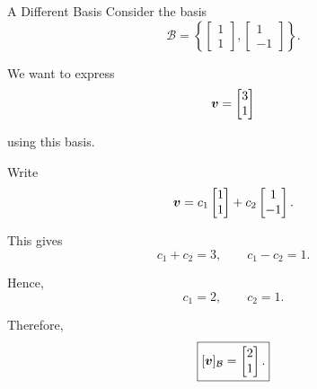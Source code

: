 \begin{frame}{A Different Basis}
\vspace{-0.3cm}
Consider the basis
\vspace{-0.1cm}
\[
\mathcal{B}
=
\left\{
\begin{bmatrix}
1\\1
\end{bmatrix},
\begin{bmatrix}
1\\-1
\end{bmatrix}
\right\}.
\]

We want to express
\vspace{-0.4cm}
\[
\bm{v}
=
\begin{bmatrix}
3\\1
\end{bmatrix}
\]
\vspace{-0.5cm}

using this basis.

Write
\vspace{-0.1cm}
\[
\bm{v}
=
c_1
\begin{bmatrix}
1\\1
\end{bmatrix}
+
c_2
\begin{bmatrix}
1\\-1
\end{bmatrix}.
\]
\vspace{-0.5cm}

This gives
\vspace{-0.1cm}
\[
c_1+c_2=3,
\qquad
c_1-c_2=1.
\]

Hence,
\vspace{-0.1cm}
\[
c_1=2,
\qquad
c_2=1.
\]

\vspace{-0.3cm}

Therefore,
\vspace{-0.1cm}
\[
\boxed{
[\bm{v}]_{\mathcal{B}}
=
\begin{bmatrix}
2\\1
\end{bmatrix}.
}
\]

\end{frame}



